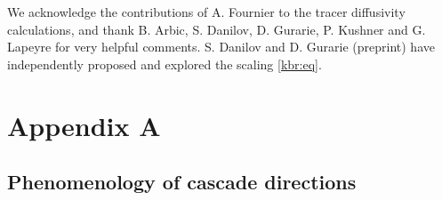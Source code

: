 \documentclass{jfm}
\begin{document}
\begin{acknowledgments}
  We acknowledge the contributions of A. Fournier to the tracer
  diffusivity calculations, and thank B. Arbic, S. Danilov, D.
  Gurarie, P. Kushner and G.  Lapeyre for very helpful comments.  S.
  Danilov and D. Gurarie (preprint) have independently proposed and
  explored the scaling \eqref{kbr:eq}.
\end{acknowledgments}

\appendix
        \addtocounter{section}{1}
        \setcounter{equation}{0}

\section*{Appendix A}
\subsection*{Phenomenology of cascade directions}
\label{phenom:sec}
\end{document}

